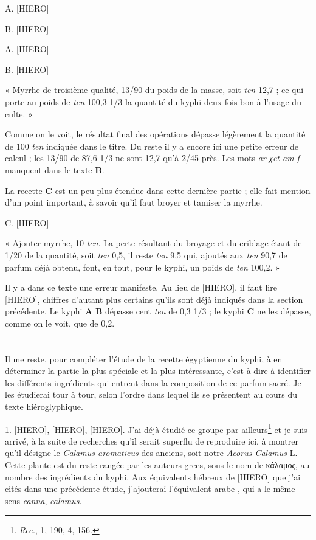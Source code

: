 \documentclass[a4paper, 11pt, oneside, landscape]{article}
\newcommand*\arabicAAAC{}
\begin{document}
A. [HIERO]

B. [HIERO]

A. [HIERO]

B. [HIERO]

« Myrrhe de troisième qualité, 13/90 du poids de la masse, soit \emph{ten} 12,7 ; ce qui porte au poids de \emph{ten} 100,3 1/3 la quantité du kyphi deux fois bon à l'usage du culte. »

Comme on le voit, le résultat final des opérations dépasse légèrement la quantité de 100 \emph{ten} indiquée dans le titre. Du reste il y a encore ici une petite erreur de calcul ; les 13/90 de 87,6 1/3 ne sont 12,7 qu'à 2/45 près. Les mots \emph{ar χet am-f} manquent dans le texte \textbf{B}.

La recette \textbf{C} est un peu plus étendue dans cette dernière partie ; elle fait mention d'un point important, à savoir qu'il faut broyer et tamiser la myrrhe.

C. [HIERO]

« Ajouter myrrhe, 10 \emph{ten}. La perte résultant du broyage et du criblage étant de 1/20 de la quantité, soit \emph{ten} 0,5, il reste \emph{ten} 9,5 qui, ajoutés aux \emph{ten} 90,7 de parfum déjà obtenu, font, en tout, pour le kyphi, un poids de \emph{ten} 100,2. »

Il y a dans ce texte une erreur manifeste. Au lieu de [HIERO], il faut lire [HIERO], chiffres d'autant plus certains qu'ils sont déjà indiqués dans la section précédente. Le kyphi \textbf{A} \textbf{B} dépasse cent \emph{ten} de 0,3 1/3 ; le kyphi \textbf{C} ne les dépasse, comme on le voit, que de 0,2.
\clearpage
\section{}
\paragraph{}
Il me reste, pour compléter l'étude de la recette égyptienne du kyphi, à en déterminer la partie la plus spéciale et la plus intéressante, c'est-à-dire à identifier les différents ingrédients qui entrent dans la composition de ce parfum sacré. Je les étudierai tour à tour, selon l'ordre dans lequel ils se présentent au cours du texte hiéroglyphique.

1. [HIERO], [HIERO], [HIERO]. J'ai déjà étudié ce groupe par ailleurs\footnote{\emph{Rec.}, 1, 190, 4, 156.} et je suis arrivé, à la suite de recherches qu'il serait superflu de reproduire ici, à montrer qu'il désigne le \emph{Calamus aromaticus} des anciens, soit notre \emph{Acorus Calamus} L. Cette plante est du reste rangée par les auteurs grecs, sous le nom de κάλαμος, au nombre des ingrédients du kyphi. Aux équivalents hébreux de [HIERO] que j'ai cités dans une précédente étude, j'ajouterai l'équivalent arabe $\arabicAAAC$, qui a le même sens \emph{canna}, \emph{calamus}.
\end{document}
